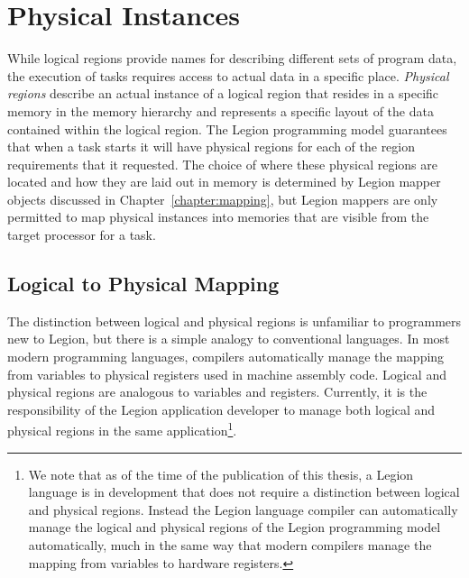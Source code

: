 \section{Physical Instances}
\label{sec:phyinst}
While logical regions provide names for describing
different sets of program data, the execution of
tasks requires access to actual data in a specific
place. {\em Physical regions} describe an actual
instance of a logical region that resides in 
a specific memory in the memory hierarchy and 
represents a specific layout of the data contained
within the logical region. The Legion programming
model guarantees that when a task starts it will
have physical regions for each of the region 
requirements that it requested. The choice of
where these physical regions are located and how
they are laid out in memory is determined by
Legion mapper objects discussed in 
Chapter~\ref{chapter:mapping}, but Legion mappers
are only permitted to map physical instances into
memories that are visible from the target
processor for a task.

\subsection{Logical to Physical Mapping}
\label{subsec:logtophys}
The distinction between logical and physical regions
is unfamiliar to programmers new to Legion, but there
is a simple analogy to conventional languages.
In most modern programming languages, compilers
automatically manage the mapping from variables
to physical registers used in machine assembly
code. Logical and physical regions are analogous
to variables and registers. Currently, 
it is the responsibility of the Legion application
developer to manage both logical and physical
regions in the same application\footnote{We note that as of
the time of the publication of this thesis, a Legion
language is in development that does not require
a distinction between logical and physical regions.
Instead the Legion language compiler can automatically
manage the logical and physical regions of the Legion
programming model automatically, much in the same
way that modern compilers manage the mapping from 
variables to hardware registers.}.

